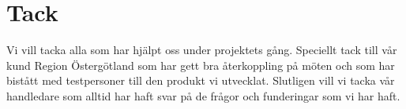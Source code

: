\section*{Tack}
Vi vill tacka alla som har hjälpt oss under projektets gång. Speciellt tack till vår kund Region Östergötland som har gett bra återkoppling på möten och som har bistått med testpersoner till den produkt vi utvecklat. Slutligen vill vi tacka vår handledare som alltid har haft svar på de frågor och funderingar som vi har haft.

\renewcommand{\contentsname}{Innehållsförteckning}

\tableofcontents

\listoffigures

\listoftables
